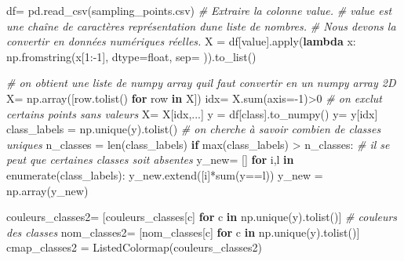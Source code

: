 \documentclass[
]{article}
\newenvironment{Shaded}{}{}
\newcommand{\BuiltInTok}[1]{\textcolor[rgb]{0.00,0.50,0.00}{#1}}
\newcommand{\CommentTok}[1]{\textcolor[rgb]{0.38,0.63,0.69}{\textit{#1}}}
\newcommand{\ControlFlowTok}[1]{\textcolor[rgb]{0.00,0.44,0.13}{\textbf{#1}}}
\newcommand{\DecValTok}[1]{\textcolor[rgb]{0.25,0.63,0.44}{#1}}
\newcommand{\KeywordTok}[1]{\textcolor[rgb]{0.00,0.44,0.13}{\textbf{#1}}}
\newcommand{\NormalTok}[1]{#1}
\newcommand{\OperatorTok}[1]{\textcolor[rgb]{0.40,0.40,0.40}{#1}}
\newcommand{\StringTok}[1]{\textcolor[rgb]{0.25,0.44,0.63}{#1}}
\begin{document}
\label{203f61c8}
\label{cb14}
\begin{Shaded}
\begin{Highlighting}[]
\NormalTok{df}\OperatorTok{=}\NormalTok{ pd.read\_csv(}\StringTok{\textquotesingle{}sampling\_points.csv\textquotesingle{}}\NormalTok{)}
\CommentTok{\# Extraire la colonne \textquotesingle{}value\textquotesingle{}.}
\CommentTok{\# \textquotesingle{}value\textquotesingle{} est une chaîne de caractères représentation d\textquotesingle{}une liste de nombres.}
\CommentTok{\# Nous devons la convertir en données numériques réelles.}
\NormalTok{X }\OperatorTok{=}\NormalTok{ df[}\StringTok{\textquotesingle{}value\textquotesingle{}}\NormalTok{].}\BuiltInTok{apply}\NormalTok{(}\KeywordTok{lambda}\NormalTok{ x: np.fromstring(x[}\DecValTok{1}\NormalTok{:}\OperatorTok{{-}}\DecValTok{1}\NormalTok{], dtype}\OperatorTok{=}\BuiltInTok{float}\NormalTok{, sep}\OperatorTok{=}\StringTok{\textquotesingle{} \textquotesingle{}}\NormalTok{)).to\_list()}

\CommentTok{\# on obtient une liste de numpy array  qu\textquotesingle{}il faut convertir en un numpy array 2D}
\NormalTok{X}\OperatorTok{=}\NormalTok{ np.array([row.tolist() }\ControlFlowTok{for}\NormalTok{ row }\KeywordTok{in}\NormalTok{ X])}
\NormalTok{idx}\OperatorTok{=}\NormalTok{ X.}\BuiltInTok{sum}\NormalTok{(axis}\OperatorTok{={-}}\DecValTok{1}\NormalTok{)}\OperatorTok{\textgreater{}}\DecValTok{0} \CommentTok{\# on exclut certains points sans valeurs}
\NormalTok{X}\OperatorTok{=}\NormalTok{ X[idx,...]}
\NormalTok{y }\OperatorTok{=}\NormalTok{ df[}\StringTok{\textquotesingle{}class\textquotesingle{}}\NormalTok{].to\_numpy()}
\NormalTok{y}\OperatorTok{=}\NormalTok{ y[idx]}
\NormalTok{class\_labels }\OperatorTok{=}\NormalTok{ np.unique(y).tolist() }\CommentTok{\# on cherche à savoir combien de classes uniques}
\NormalTok{n\_classes }\OperatorTok{=} \BuiltInTok{len}\NormalTok{(class\_labels)}
\ControlFlowTok{if} \BuiltInTok{max}\NormalTok{(class\_labels) }\OperatorTok{\textgreater{}}\NormalTok{ n\_classes: }\CommentTok{\# il se peut que certaines classes soit absentes}
\NormalTok{  y\_new}\OperatorTok{=}\NormalTok{ []}
  \ControlFlowTok{for}\NormalTok{ i,l }\KeywordTok{in} \BuiltInTok{enumerate}\NormalTok{(class\_labels):}
\NormalTok{    y\_new.extend([i]}\OperatorTok{*}\BuiltInTok{sum}\NormalTok{(y}\OperatorTok{==}\NormalTok{l))}
\NormalTok{  y\_new }\OperatorTok{=}\NormalTok{ np.array(y\_new)}

\NormalTok{couleurs\_classes2}\OperatorTok{=}\NormalTok{ [couleurs\_classes[c] }\ControlFlowTok{for}\NormalTok{ c }\KeywordTok{in}\NormalTok{ np.unique(y).tolist()] }\CommentTok{\# couleurs des classes}
\NormalTok{nom\_classes2}\OperatorTok{=}\NormalTok{ [nom\_classes[c] }\ControlFlowTok{for}\NormalTok{ c }\KeywordTok{in}\NormalTok{ np.unique(y).tolist()]}
\NormalTok{cmap\_classes2 }\OperatorTok{=}\NormalTok{ ListedColormap(couleurs\_classes2)}
\end{Highlighting}
\end{Shaded}
\end{document}
